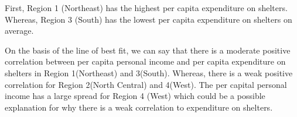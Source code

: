 \documentclass{article}
\begin{document}
\vspace{0.5cm}
\noindent 

First, Region 1 (Northeast) has the highest per capita expenditure on shelters. Whereas, Region 3 (South) has the lowest per capita expenditure on shelters on average.
\vspace{0.5cm}

\noindent On the basis of the line of best fit, we can say that there is a moderate positive correlation between per capita personal income and per capita expenditure on shelters in Region 1(Northeast) and 3(South). Whereas, there is a weak positive correlation for Region 2(North Central) and 4(West).
The per capital personal income has a large spread for Region 4 (West) which could be a possible explanation for why there is a weak correlation to expenditure on shelters. 
\end{document}
